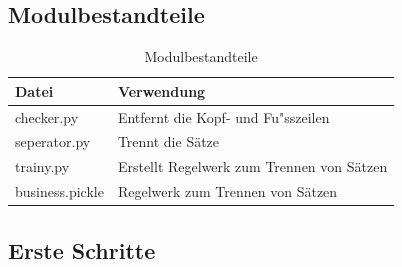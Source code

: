 \documentclass[12pt]{scrartcl}
\begin{document}
\subsection{Modulbestandteile}
\label{sec:modulbestandteile}
\begin{table}[H]
\centering
\label{modulbestandteil}
\begin{tabular}{|l|l|}
\hline
\rowcolor[HTML]{9B9B9B} 
Datei                & Verwendung                                 \\ \hline
checker.py           & Entfernt die Kopf- und Fu"sszeilen         \\ \hline
seperator.py         & Trennt die Sätze                           \\ \hline
trainy.py            & Erstellt Regelwerk zum Trennen von Sätzen  \\ \hline
business.pickle      & Regelwerk zum Trennen von Sätzen           \\ \hline
\end{tabular}
\caption{Modulbestandteile}
\end{table}
\newpage
\subsection{Erste Schritte}
\label{sec:first-steps}
\end{document}
